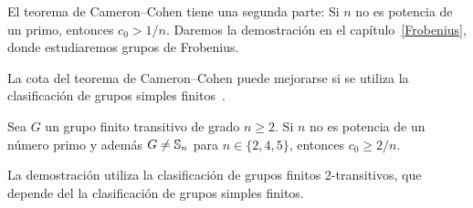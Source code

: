 El teorema de Cameron--Cohen tiene una segunda parte: 
Si $n$ no es potencia de un primo, entonces $c_0>1/n$. 
Daremos la demostración en el capítulo~\ref{Frobenius}, donde 
estudiaremos grupos de Frobenius.  

La cota del teorema de Cameron--Cohen puede mejorarse si se utiliza la 
clasificación de grupos simples finitos~\cite{MR1484879}.  

\begin{theorem}
Sea $G$ un grupo finito transitivo de grado $n\geq2$. Si $n$ no es potencia de un 
número primo 
y además $G\ne\mathbb{S}_n$ para $n\in\{2,4,5\}$, entonces $c_0\geq 2/n$.
\end{theorem}

La demostración utiliza la clasificación de grupos finitos 2-transitivos, que depende del 
la clasificación de grupos simples finitos.



